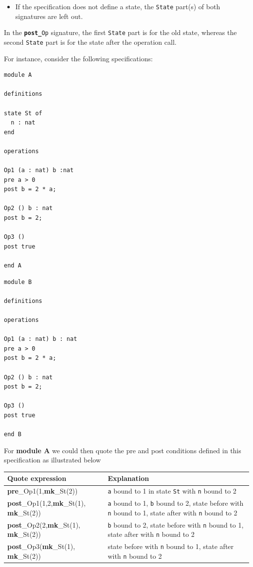 \documentclass{overturerepchap}
\newcommand{\keyw}[1]{{\bf\ttfamily #1}}
\begin{document}
\begin{description}
\begin{itemize}
\item If the specification does not define a state, the {\tt State} part(s)
  of both signatures are left out.
\end{itemize}

In the {\tt \keyw{post\_}Op} signature, the first {\tt State} part is for
the old state, whereas the second {\tt State} part is for the 
state after the operation call.

For instance, consider the following specifications:

\begin{lstlisting}
module A

definitions

state St of
  n : nat
end

operations

Op1 (a : nat) b :nat
pre a > 0
post b = 2 * a;

Op2 () b : nat
post b = 2;

Op3 ()
post true

end A
\end{lstlisting}

\begin{lstlisting}
module B

definitions

operations

Op1 (a : nat) b : nat
pre a > 0
post b = 2 * a;

Op2 () b : nat
post b = 2;

Op3 ()
post true

end B
\end{lstlisting}

For \textbf{module A} we could then quote the pre and post conditions
defined in this specification as illustrated below

\begin{tabular}{|p{}|p{}|} \hline
\textrm{Quote expression} & Explanation \\ \hline
\keyw{pre}\_Op1(1,\keyw{mk}\_St(2))              
  & \texttt{a} bound to 1 in state \texttt{St} with \texttt{n}  bound to 2 \\
\keyw{post}\_Op1(1,2,\keyw{mk}\_St(1), \keyw{mk}\_St(2)) 
  & \texttt{a} bound to 1, \texttt{b} bound to 2, state before with
    \texttt{n} bound to 1, state after with \texttt{n} bound to 2 \\
\keyw{post}\_Op2(2,\keyw{mk}\_St(1), \keyw{mk}\_St(2))   
  & \texttt{b} bound to 2, state before with \texttt{n} bound to 1, state
    after with \texttt{n} bound to 2 \\
\keyw{post}\_Op3(\keyw{mk}\_St(1), \keyw{mk}\_St(2))     
  & state before with \texttt{n} bound to 1, state after with
    \texttt{n} bound to 2 \\
\hline
\end{tabular}


\end{description}
\end{document}
